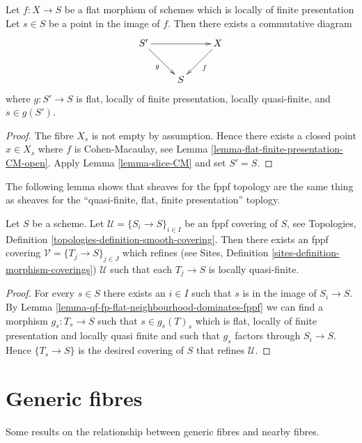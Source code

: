 \begin{lemma}
\label{lemma-qf-fp-flat-neighbourhood-dominates-fppf}
Let $f : X \to S$ be a flat morphism of schemes which is
locally of finite presentation Let $s \in S$ be a point in the image of $f$.
Then there exists a commutative diagram
$$
\xymatrix{
S' \ar[rr] \ar[rd]_g & & X \ar[ld]^f \\
& S
}
$$
where $g : S' \to S$ is flat, locally of finite presentation,
locally quasi-finite, and $s \in g(S')$.
\end{lemma}

\begin{proof}
The fibre $X_s$ is not empty by assumption. Hence there exists a closed
point $x \in X_s$ where $f$ is Cohen-Macaulay, see
Lemma \ref{lemma-flat-finite-presentation-CM-open}.
Apply
Lemma \ref{lemma-slice-CM}
and set $S' = S$.
\end{proof}

\noindent
The following lemma shows that sheaves for the fppf topology are
the same thing as sheaves for the
``quasi-finite, flat, finite presentation'' toplogy.

\begin{lemma}
\label{lemma-qf-fp-flat-dominates-fppf}
Let $S$ be a scheme. Let $\mathcal{U} = \{S_i \to S\}_{i \in I}$ be an fppf
covering of $S$, see
Topologies, Definition \ref{topologies-definition-smooth-covering}.
Then there exists an fppf covering $\mathcal{V} = \{T_j \to S\}_{j \in J}$
which refines (see
Sites, Definition \ref{sites-definition-morphism-coverings})
$\mathcal{U}$ such that each $T_j \to S$ is locally quasi-finite.
\end{lemma}

\begin{proof}
For every $s \in S$ there exists an $i \in I$ such that $s$ is in
the image of $S_i \to S$. By
Lemma \ref{lemma-qf-fp-flat-neighbourhood-dominates-fppf}
we can find a morphism $g_s : T_s \to S$ such that $s \in g_s(T)_s$
which is flat, locally of finite presentation and locally quasi finite
and such that $g_s$ factors through $S_i \to S$. Hence
$\{T_s \to S\}$ is the desired covering of $S$ that refines $\mathcal{U}$.
\end{proof}



\section{Generic fibres}
\label{section-generic}

\noindent
Some results on the relationship between generic fibres and
nearby fibres.


